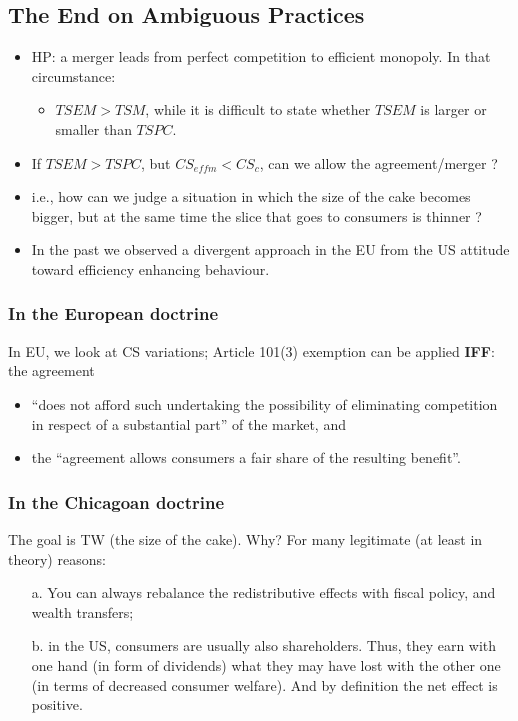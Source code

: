 
    \subsection{The End on Ambiguous Practices}

        \begin{itemize}
            \item HP: a merger leads from perfect competition to efficient monopoly. In that circumstance:
                \begin{itemize}
                    \item $TSEM > TSM$, while it is difficult to state whether $TSEM$ is larger or smaller than $TSPC$.
                \end{itemize}
            \item If $TSEM > TSPC$, but $CS_{effm} < CS_c$, can we allow the agreement/merger ?
            \item i.e., how can we judge a situation in which the size of the cake becomes bigger, but at the same time the slice that goes to consumers is thinner ?
            \item In the past we observed a divergent approach in the EU from the US attitude toward efficiency enhancing behaviour.
        \end{itemize}

        \subsubsection{In the European doctrine}

            In EU, we look at CS variations; Article 101(3) exemption can be applied \textbf{IFF}: the agreement
                \begin{itemize}
                    \item “does not afford such undertaking the possibility of eliminating competition in respect of a substantial part” of the market, and
                    \item the “agreement allows consumers a fair share of the resulting benefit”.
                \end{itemize}

        \subsubsection{In the Chicagoan doctrine}

            The goal is TW (the size of the cake). Why? For many legitimate (at least in theory) reasons:
                \begin{itemize}
                    \item[a.] You can always rebalance the redistributive effects with fiscal policy, and wealth transfers;
                    \item[b.] in the US, consumers are usually also shareholders. Thus, they earn with one hand (in form of dividends) what they may have lost with the other one (in terms of decreased consumer welfare). And by definition the net effect is positive.
                \end{itemize}
